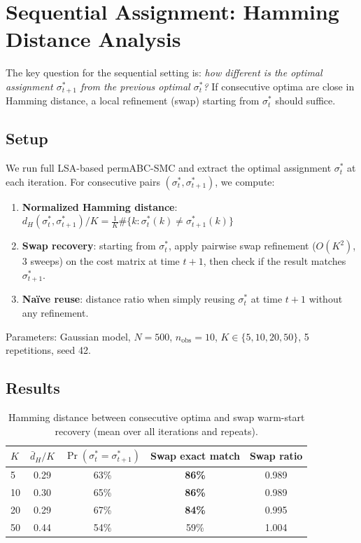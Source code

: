 \documentclass[11pt,a4paper]{article}
\begin{document}
\section{Sequential Assignment: Hamming Distance Analysis}
\label{sec:hamming}

The key question for the sequential setting is: \emph{how different is the optimal assignment $\sigma_{t+1}^*$ from the previous optimal $\sigma_t^*$?} If consecutive optima are close in Hamming distance, a local refinement (swap) starting from $\sigma_t^*$ should suffice.

\subsection{Setup}

We run full LSA-based permABC-SMC and extract the optimal assignment $\sigma_t^*$ at each iteration. For consecutive pairs $(\sigma_t^*, \sigma_{t+1}^*)$, we compute:
\begin{enumerate}
  \item \textbf{Normalized Hamming distance}: $d_H(\sigma_t^*, \sigma_{t+1}^*)/K = \frac{1}{K}\#\{k : \sigma_t^*(k) \neq \sigma_{t+1}^*(k)\}$
  \item \textbf{Swap recovery}: starting from $\sigma_t^*$, apply pairwise swap refinement ($O(K^2)$, 3 sweeps) on the cost matrix at time $t{+}1$, then check if the result matches $\sigma_{t+1}^*$.
  \item \textbf{Na\"ive reuse}: distance ratio when simply reusing $\sigma_t^*$ at time $t{+}1$ without any refinement.
\end{enumerate}

Parameters: Gaussian model, $N=500$, $n_{\text{obs}}=10$, $K \in \{5, 10, 20, 50\}$, 5 repetitions, seed 42.

\subsection{Results}

\begin{table}[h!]
\centering
\caption{Hamming distance between consecutive optima and swap warm-start recovery (mean over all iterations and repeats).}
\label{tab:hamming}
\begin{tabular}{l cccc}
\toprule
$K$ & $\bar{d}_H / K$ & $\Pr(\sigma_t^* = \sigma_{t+1}^*)$ & Swap exact match & Swap ratio \\
\midrule
5   & 0.29 & 63\% & \textbf{86\%} & 0.989 \\
10  & 0.30 & 65\% & \textbf{86\%} & 0.989 \\
20  & 0.29 & 67\% & \textbf{84\%} & 0.995 \\
50  & 0.44 & 54\% & 59\% & 1.004 \\
\bottomrule
\end{tabular}
\end{table}
\end{document}
